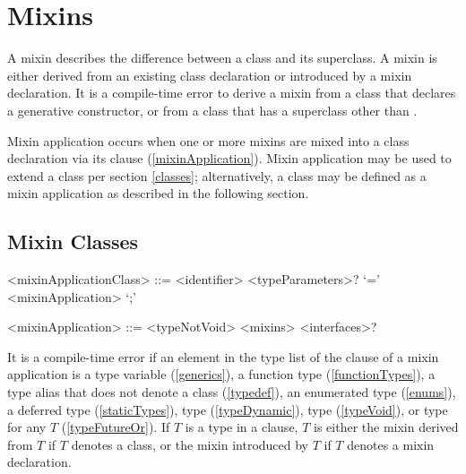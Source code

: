 \documentclass[makeidx]{article}
\begin{document}


\section{Mixins}

\LMHash{}%
A mixin describes the difference between a class and its superclass.
A mixin is either derived from an existing class declaration
or introduced by a mixin declaration.
It is a compile-time error to derive a mixin from
a class that declares a generative constructor,
or from a class that has a superclass other than .

\LMHash{}%
Mixin application occurs when one or more mixins are mixed into
a class declaration via its \WITH{} clause (\ref{mixinApplication}).
Mixin application may be used to extend a class per section \ref{classes};
alternatively, a class may be defined as a mixin application
as described in the following section.


\subsection{Mixin Classes}

\begin{grammar}
<mixinApplicationClass> ::= \gnewline{}
  <identifier> <typeParameters>? `=' <mixinApplication> `;'

<mixinApplication> ::= <typeNotVoid> <mixins> <interfaces>?
\end{grammar}

\LMHash{}%
It is a compile-time error if an element in
the type list of the \WITH{} clause of a mixin application is
a type variable (\ref{generics}),
a function type (\ref{functionTypes}),
a type alias that does not denote a class (\ref{typedef}),
an enumerated type (\ref{enums}),
a deferred type (\ref{staticTypes}),
type \DYNAMIC{} (\ref{typeDynamic}),
type \VOID{} (\ref{typeVoid}),
or type  for any $T$ (\ref{typeFutureOr}).
If $T$ is a type in a \WITH{} clause, 
$T$ is either the mixin derived from $T$ if $T$ denotes a class,
or the mixin introduced by $T$ if $T$ denotes a mixin declaration.
\end{document}
